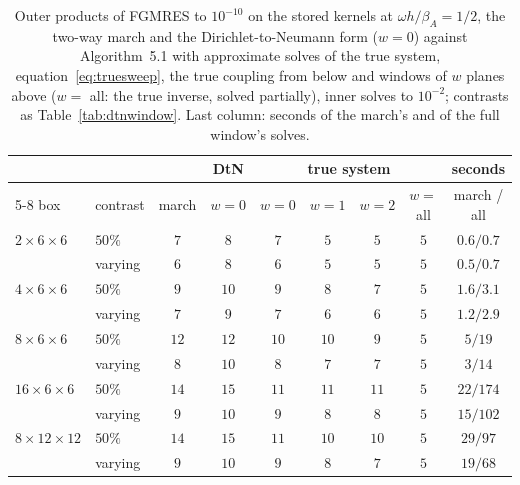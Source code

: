 \documentclass[11pt,a4paper]{article}
\begin{document}
\begin{table}[htbp]
\centering
\caption{Outer products of FGMRES to $10^{-10}$ on the stored kernels at $\omega h/\beta_A=1/2$, the two-way march
and the Dirichlet-to-Neumann form ($w=0$) against Algorithm~5.1 with approximate solves of the true system,
equation~\eqref{eq:truesweep}, the true coupling from below and windows of $w$ planes above ($w=$ all: the true
inverse, solved partially), inner solves to $10^{-2}$; contrasts as Table~\ref{tab:dtnwindow}. Last column: seconds
of the march's and of the full window's solves.}
\label{tab:truesweep}
\begin{tabular}{llccccccc}
\toprule
 & & & DtN & \multicolumn{4}{c}{true system} & seconds \\
\cmidrule(lr){5-8}
box & contrast & march & $w=0$ & $w=0$ & $w=1$ & $w=2$ & $w=$ all & march / all \\
\midrule
$2\times6\times6$ & $50\%$ & $7$ & $8$ & $7$ & $5$ & $5$ & $5$ & $0.6/0.7$ \\
 & varying & $6$ & $8$ & $6$ & $5$ & $5$ & $5$ & $0.5/0.7$ \\
$4\times6\times6$ & $50\%$ & $9$ & $10$ & $9$ & $8$ & $7$ & $5$ & $1.6/3.1$ \\
 & varying & $7$ & $9$ & $7$ & $6$ & $6$ & $5$ & $1.2/2.9$ \\
$8\times6\times6$ & $50\%$ & $12$ & $12$ & $10$ & $10$ & $9$ & $5$ & $5/19$ \\
 & varying & $8$ & $10$ & $8$ & $7$ & $7$ & $5$ & $3/14$ \\
$16\times6\times6$ & $50\%$ & $14$ & $15$ & $11$ & $11$ & $11$ & $5$ & $22/174$ \\
 & varying & $9$ & $10$ & $9$ & $8$ & $8$ & $5$ & $15/102$ \\
$8\times12\times12$ & $50\%$ & $14$ & $15$ & $11$ & $10$ & $10$ & $5$ & $29/97$ \\
 & varying & $9$ & $10$ & $9$ & $8$ & $7$ & $5$ & $19/68$ \\
\bottomrule
\end{tabular}
\end{table}
\end{document}

